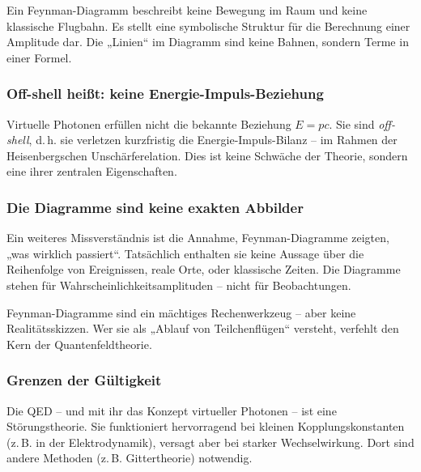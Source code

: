 \vspace{0.5em}
\begin{tcolorbox}[didaktikbox, title=Keine Teilchenbahn im Diagramm]
	\label{box: Keine Teilchenbahn im Diagramm}
	Ein Feynman-Diagramm beschreibt keine Bewegung im Raum und keine klassische Flugbahn. Es stellt eine symbolische Struktur für die Berechnung einer Amplitude dar. Die „Linien“ im Diagramm sind keine Bahnen, sondern Terme in einer Formel.
\end{tcolorbox}

\subsubsection*{Off-shell heißt: keine Energie-Impuls-Beziehung}
Virtuelle Photonen erfüllen nicht die bekannte Beziehung $E = pc$. Sie sind \emph{off-shell}, d.\,h. sie verletzen kurzfristig die Energie-Impuls-Bilanz – im Rahmen der Heisenbergschen Unschärferelation. Dies ist keine Schwäche der Theorie, sondern eine ihrer zentralen Eigenschaften.

\subsubsection*{Die Diagramme sind keine exakten Abbilder}
Ein weiteres Missverständnis ist die Annahme, Feynman-Diagramme zeigten, „was wirklich passiert“. Tatsächlich enthalten sie keine Aussage über die Reihenfolge von Ereignissen, reale Orte, oder klassische Zeiten. Die Diagramme stehen für Wahrscheinlichkeitsamplituden – nicht für Beobachtungen.

\vspace{0.5em}
\begin{tcolorbox}[warnbox, title=Warnung: Feynman-Diagramme nicht wörtlich nehmen!]
	\label{box:Warnung}
	Feynman-Diagramme sind ein mächtiges Rechenwerkzeug – aber keine Realitätsskizzen. Wer sie als „Ablauf von Teilchenflügen“ versteht, verfehlt den Kern der Quantenfeldtheorie.
\end{tcolorbox}

\subsubsection*{Grenzen der Gültigkeit}
Die QED – und mit ihr das Konzept virtueller Photonen – ist eine Störungstheorie. Sie funktioniert hervorragend bei kleinen Kopplungskonstanten (z.\,B. in der Elektrodynamik), versagt aber bei starker Wechselwirkung. Dort sind andere Methoden (z.\,B. Gittertheorie) notwendig.

